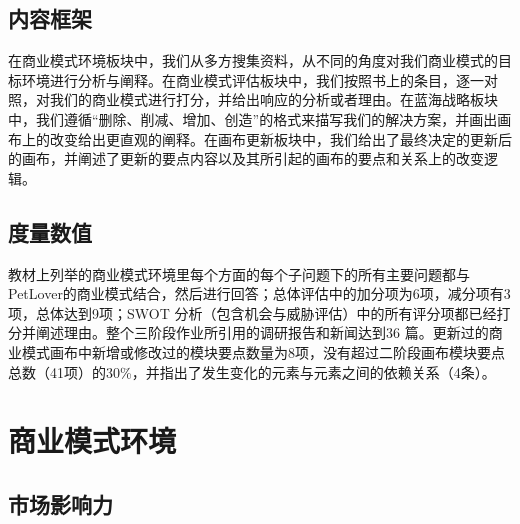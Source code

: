 \documentclass[a4paper]{ctexart}
\begin{document}
\subsection{内容框架}
在商业模式环境板块中，我们从多方搜集资料，从不同的角度对我们商业模式的目标环境进行分析与阐释。在商业模式评估板块中，我们按照书上的条目，逐一对照，对我们的商业模式进行打分，并给出响应的分析或者理由。在蓝海战略板块中，我们遵循“删除、削减、增加、创造”的格式来描写我们的解决方案，并画出画布上的改变给出更直观的阐释。在画布更新板块中，我们给出了最终决定的更新后的画布，并阐述了更新的要点内容以及其所引起的画布的要点和关系上的改变逻辑。

\subsection{度量数值}
教材上列举的商业模式环境里每个方面的每个子问题下的所有主要问题都与PetLover的商业模式结合，然后进行回答；总体评估中的加分项为6项，减分项有3项，总体达到9项；SWOT 分析（包含机会与威胁评估）中的所有评分项都已经打分并阐述理由。整个三阶段作业所引用的调研报告和新闻达到36 篇。更新过的商业模式画布中新增或修改过的模块要点数量为8项，没有超过二阶段画布模块要点总数（41项）的30\%，并指出了发生变化的元素与元素之间的依赖关系（4条）。

\section{商业模式环境}
\subsection{市场影响力}
\end{document}

